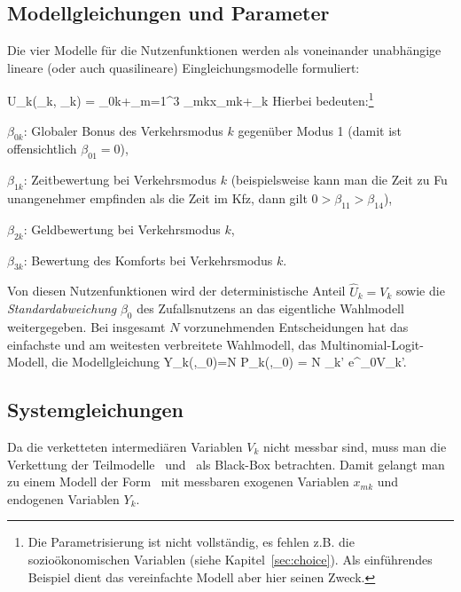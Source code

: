 \subsection{Modellgleichungen und Parameter}

Die vier Modelle f\"ur die Nutzenfunktionen werden als voneinander
unabh\"angige 
lineare (oder auch quasilineare) Eingleichungsmodelle  formuliert:

\be
\label{beisp-modell-nutzen}
U_k(_k, \vec{\beta}_k)
= \beta_{0k}+\sum_{m=1}^3 \beta_{mk}x_{mk}+\epsilon_k
\ee
Hierbei bedeuten:\footnote{Die Parametrisierung ist nicht
vollst\"andig, es fehlen z.B. die sozio\"okonomischen Variablen (siehe
Kapitel~\ref{sec:choice}). Als einf\"uhrendes Beispiel dient das
vereinfachte Modell aber
hier seinen Zweck.}
\bi
\item $\beta_{0k}$: Globaler Bonus des Verkehrsmodus $k$
gegen\"uber Modus 1 (damit ist offensichtlich $\beta_{01}=0$),
\item $\beta_{1k}$: Zeitbewertung bei Verkehrsmodus $k$
(beispielsweise kann man die Zeit zu Fu\3 unangenehmer empfinden als
die Zeit im Kfz, dann gilt $0 > \beta_{11}>\beta_{14}$),
\item $\beta_{2k}$: Geldbewertung bei Verkehrsmodus $k$,
\item $\beta_{3k}$: Bewertung des Komforts bei Verkehrsmodus $k$.
\ei


Von diesen Nutzenfunktionen wird der deterministische Anteil
$\hat{U}_k=V_k$ sowie die \emph{Standardabweichung} $\beta_0$ des
Zufallsnutzens an das eigentliche Wahlmodell weitergegeben. 
Bei insgesamt $N$ vorzunehmenden Entscheidungen hat das einfachste und
am weitesten verbreitete Wahlmodell, das 
Multinomial-Logit-Modell, die Modellgleichung
\be
\label{beisp-MNL}
Y_k(,\beta_0)=N P_k(,\beta_0) = N
  {\sum_{k'} e^{\beta_0V_{k'}}}.
\ee

\subsection{Systemgleichungen}

Da die verketteten intermedi\"aren Variablen $V_k$ nicht messbar sind,
muss man die Verkettung der Teilmodelle~
und~   als Black-Box betrachten. Damit gelangt man zu
einem Modell der Form~ mit messbaren exogenen
Variablen $x_{mk}$ und endogenen Variablen $Y_k$.

